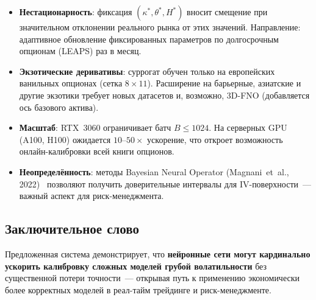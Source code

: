 \begin{itemize}
  \item \textbf{Нестационарность}: фиксация $(\kappa^*, \theta^*, H^*)$
        вносит смещение при значительном отклонении реального рынка от этих значений.
        Направление: адаптивное обновление фиксированных параметров по долгосрочным
        опционам (LEAPS) раз в месяц.

  \item \textbf{Экзотические деривативы}: суррогат обучен только на
        европейских ванильных опционах (сетка $8\times11$). Расширение
        на барьерные, азиатские и другие экзотики требует новых датасетов
        и, возможно, 3D-FNO (добавляется ось базового актива).

  \item \textbf{Масштаб}: RTX~3060 ограничивает батч $B\leq1024$.
        На серверных GPU (A100, H100) ожидается $10$--$50\times$ ускорение,
        что откроет возможность онлайн-калибровки всей книги опционов.

  \item \textbf{Неопределённость}: методы Bayesian Neural Operator
        (Magnani~et~al., 2022)~\cite{Magnani2022} позволяют получить
        доверительные интервалы для IV-поверхности~--- важный аспект для
        риск-менеджмента.
\end{itemize}

\subsection*{Заключительное слово}

Предложенная система демонстрирует, что \textbf{нейронные сети могут
кардинально ускорить калибровку сложных моделей грубой волатильности}
без существенной потери точности~--- открывая путь к применению
экономически более корректных моделей в реал-тайм трейдинге и риск-менеджменте.
